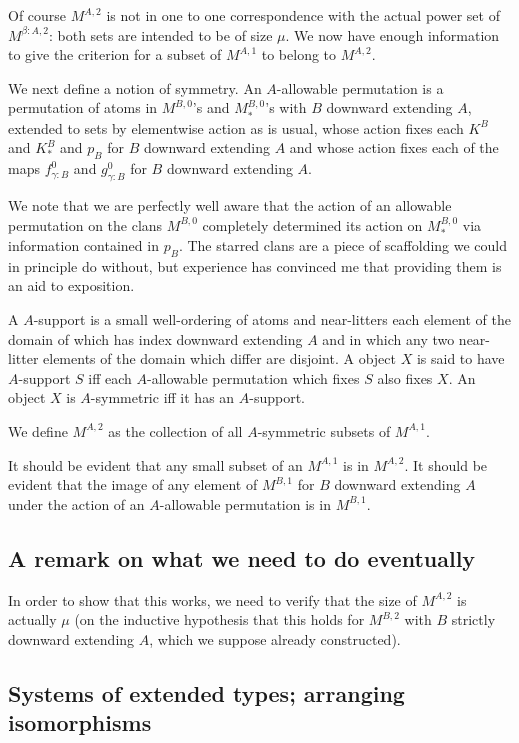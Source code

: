 \documentclass[12pt]{article}
\begin{document}
Of course $M^{A,2}$ is not in one to one correspondence with the actual power set of $M^{\beta:A,2}$:  both sets are intended to be of size $\mu$.  We now have enough information to give the criterion for a subset of $M^{A,1}$ to belong to $M^{A,2}$.

We next define a notion of symmetry.  An $A$-allowable permutation is a permutation of atoms in $M^{B,0}$'s and $M^{B,0}_*$'s with $B$ downward extending $A$, extended to sets
by elementwise action as is usual, whose action fixes each $K^B$ and $K_*^B$ and $p_B$  for $B$ downward extending $A$ and whose action fixes each of the maps
$f^0_{\gamma:B}$ and $g^0_{\gamma:B}$ for $B$ downward extending $A$.

We note that we are perfectly well aware that the action of an allowable permutation on the clans $M^{B,0}$ completely determined its action on  $M^{B,0}_*$ via information contained in $p_B$.  The starred clans are a piece of scaffolding we could in principle do without, but experience has convinced me that providing them is an aid to exposition.

A $A$-support is a small well-ordering of atoms and near-litters each element of the domain of which has index downward extending $A$ and in which any two near-litter elements  of the domain which differ are disjoint.
A object $X$ is said to have $A$-support $S$ iff each $A$-allowable permutation which fixes $S$ also fixes $X$.  An object $X$ is $A$-symmetric iff it has an $A$-support.

We define $M^{A,2}$ as the collection of all $A$-symmetric subsets of $M^{A,1}$.

It should be evident that any small subset of an $M^{A,1}$ is in $M^{A,2}$.  It should be evident that the image of any element of $M^{B,1}$ for $B$ downward extending $A$ under the action of an $A$-allowable permutation is in $M^{B,1}$.

\subsection{A remark on what we need to do eventually}

In order to show that this works, we need to verify that the size of $M^{A,2}$ is actually $\mu$ (on the inductive hypothesis that this holds for $M^{B,2}$ with $B$ strictly downward extending $A$, which we suppose already constructed).

\subsection{Systems of extended types;  arranging isomorphisms}
\end{document}
